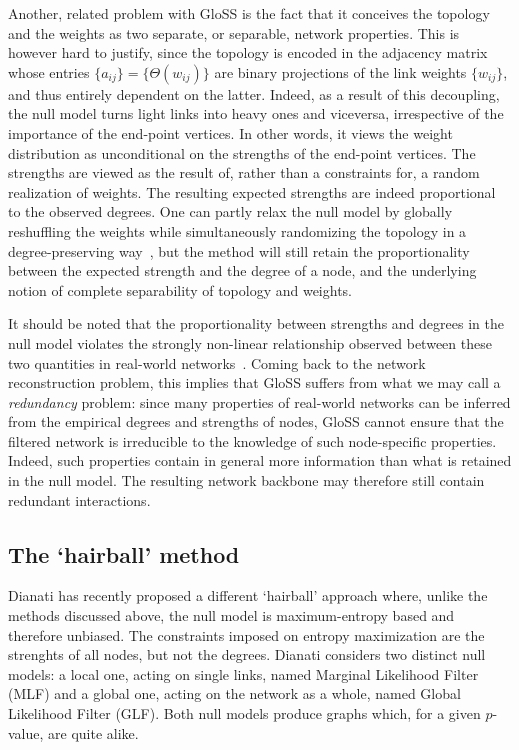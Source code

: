 \documentclass[aps,twocolumn,superscriptaddress]{revtex4-1}
\newcommand{\gloss}{GloSS }
\begin{document}
Another, related problem with \gloss is the fact that it conceives the topology and the weights as two separate, or separable, network properties. This is however hard to justify, since the topology is encoded in the adjacency matrix whose entries $\{a_{ij}\}=\{\Theta(w_{ij})\}$ are binary projections of the link weights $\{w_{ij}\}$, and thus entirely dependent on the latter. 
Indeed, as a result of this decoupling, the null model turns light links into heavy ones and viceversa, irrespective of the importance of the end-point vertices. In other words, it views the weight distribution as unconditional on the strengths of the end-point vertices. The strengths are viewed as the result of, rather than a constraints for, a random realization of weights.
The resulting expected strengths are indeed proportional to the observed degrees.
One can partly relax the null model by globally reshuffling the weights while simultaneously randomizing the topology in a degree-preserving way~\cite{ramasco}, but the method will still retain the proportionality between the expected strength and the degree of a node, and the underlying notion of complete separability of topology and weights.

It should be noted that the proportionality between strengths and degrees in the null model violates the strongly non-linear relationship observed between these two quantities in real-world networks~\cite{barrat-pnas-2004,cimini-pre-2015,cimini-2015-scirep}. 
Coming back to the network reconstruction problem, this implies that \gloss suffers from what we may call a \emph{redundancy} problem: since many properties of real-world networks can be inferred from the empirical degrees and strengths of nodes, \gloss cannot ensure that the filtered network is irreducible to the knowledge of such node-specific properties.
Indeed, such properties contain in general more information than what is retained in the null model. 
The resulting network backbone may therefore still contain redundant interactions.

\subsection{The `hairball' method}
Dianati has recently proposed a different `hairball' approach where, unlike the methods discussed above, the null model is maximum-entropy based and therefore unbiased. The constraints imposed on entropy maximization are the strenghts of all nodes, but not the degrees. Dianati considers two distinct null models: a local one, acting on single links, named Marginal Likelihood Filter (MLF) and a global one, acting on the network as a whole, named Global Likelihood Filter (GLF). Both null models produce graphs which, for a given $p$-value, are quite alike.%
\end{document}
